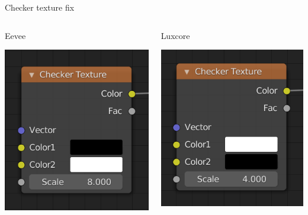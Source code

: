 \documentclass[presentation, 8pt]{beamer}
\begin{document}
\begin{frame}[label={sec:orgf2f1443}]{Checker texture fix}
\begin{columns}
\begin{column}{0.45\columnwidth}
\begin{block}{Eevee}
\begin{center}
\includegraphics[width=.9\linewidth]{Images/checktexture-fix.png}
\end{center}
\end{block}
\end{column}
\begin{column}{0.45\columnwidth}
\begin{block}{Luxcore}
\begin{center}
\includegraphics[width=.9\linewidth]{Images/checktexture-fix-luxcore.png}

\end{center}
\end{block}
\end{column}
\end{columns}
\end{frame}
\end{document}
